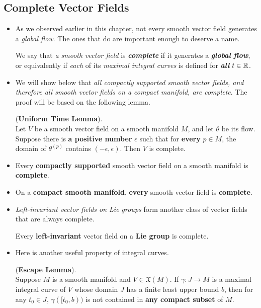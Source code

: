 \documentclass[11pt]{article}
\begin{document}
\subsection{Complete Vector Fields}
\begin{itemize}
\item As we observed earlier in this chapter, not every smooth vector field generates a \emph{global flow}. The ones that do are important enough to deserve a name. 
\begin{definition}
We say that\emph{ a smooth vector field} is \emph{\textbf{complete}} if it generates a \emph{\textbf{global flow}}, or equivalently if \emph{each} of its \emph{maximal integral curves} is defined for \emph{\textbf{all} $t \in {\mathbb R}$}. 
\end{definition}

\item We will show below that \emph{all compactly supported smooth vector fields, and therefore all smooth vector fields on a compact manifold, are complete}. The proof will
be based on the following lemma.

 \begin{lemma} (\textbf{Uniform Time Lemma}).\\
 Let $V$ be a smooth vector field on a smooth manifold $M$, and let $\theta$ be its flow. Suppose there is \textbf{a positive number} $\epsilon$ such that for
\textbf{every} $p \in M$, the domain of $\theta^{(p)}$ contains $(-\epsilon, \epsilon)$. Then $V$ is complete.
\end{lemma}

\item \begin{theorem}
Every \textbf{compactly supported} smooth vector field on a smooth manifold is \textbf{complete}.
\end{theorem}

\item \begin{corollary} 
On a \textbf{compact smooth manifold}, \textbf{every} smooth vector field is \textbf{complete}. 
\end{corollary}

\item \emph{Left-invariant vector fields on Lie groups} form another class of vector fields that are always complete.
\begin{theorem}
Every \textbf{left-invariant} vector field on a \textbf{Lie group} is complete.
\end{theorem}

\item Here is another useful property of integral curves.
\begin{lemma}  (\textbf{Escape Lemma}).\\
Suppose $M$ is a smooth manifold and $V \in \mathfrak{X}(M)$. If $\gamma:  J \rightarrow M$ is a maximal integral curve of $V$ whose domain $J$ has a finite least
upper bound $b$, then for any $t_0 \in J$, $\gamma([t_0, b))$ is not contained in \textbf{any compact subset} of $M$.
\end{lemma}
\end{itemize}
\end{document}
